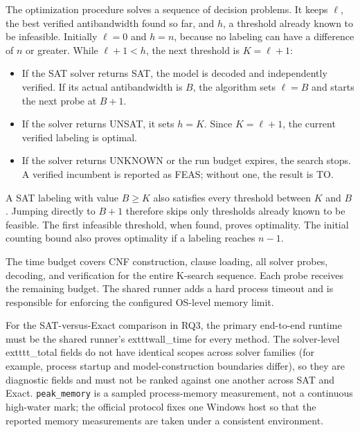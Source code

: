 The optimization procedure solves a sequence of decision problems. It keeps
$\ell$, the best verified antibandwidth found so far, and $h$, a threshold
already known to be infeasible. Initially $\ell=0$ and $h=n$, because no
labeling can have a difference of $n$ or greater. While $\ell+1<h$, the next
threshold is $K=\ell+1$:
\begin{itemize}
  \item If the SAT solver returns SAT, the model is decoded and independently
    verified. If its actual antibandwidth is $B$, the algorithm sets
    $\ell=B$ and starts the next probe at $B+1$.
  \item If the solver returns UNSAT, it sets $h=K$. Since $K=\ell+1$, the
    current verified labeling is optimal.
  \item If the solver returns UNKNOWN or the run budget expires, the search
    stops. A verified incumbent is reported as FEAS; without one, the result is
    TO.
\end{itemize}
A SAT labeling with value $B\geq K$ also satisfies every threshold between
$K$ and $B$. Jumping directly to $B+1$ therefore skips only thresholds already
known to be feasible. The first infeasible threshold, when found, proves
optimality. The initial counting bound also proves optimality if a labeling
reaches $n-1$.

The time budget covers CNF construction, clause loading, all solver probes,
decoding, and verification for the entire K-search sequence. Each probe
receives the remaining budget. The shared runner adds a hard process timeout
and is responsible for enforcing the configured OS-level memory limit.

For the SAT-versus-Exact comparison in RQ3, the primary end-to-end runtime
must be the shared runner's 	exttt{wall\_time} for every method. The
solver-level 	exttt{t\_total} fields do not have identical scopes across
solver families (for example, process startup and model-construction
boundaries differ), so they are diagnostic fields and must not be ranked
against one another across SAT and Exact.
\texttt{peak\_memory} is a sampled process-memory measurement, not a
continuous high-water mark; the official protocol fixes one Windows host so
that the reported memory measurements are taken under a consistent
environment.

